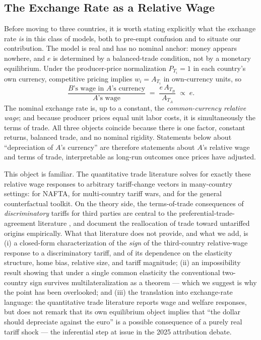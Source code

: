 \documentclass[11pt]{article}
\theoremstyle{plain}
\theoremstyle{remark}
\numberwithin{lemma}{section}
\numberwithin{proposition}{section}
\numberwithin{corollary}{section}
\newenvironment{revblock}{\par\begingroup\color{RevBlue}}{\endgroup\par}
\begin{document}
\begin{revblock}
\subsection{The Exchange Rate as a Relative Wage}
\label{sec:relwage}

Before moving to three countries, it is worth stating explicitly what the exchange rate \emph{is} in this class of models, both to pre-empt confusion and to situate our contribution. The model is real and has no nominal anchor: money appears nowhere, and $e$ is determined by a balanced-trade condition, not by a monetary equilibrium. Under the producer-price normalization $P_{T_i} = 1$ in each country's own currency, competitive pricing implies $w_i = A_{T_i}$ in own-currency units, so
\[
\frac{\text{$B$'s wage in $A$'s currency}}{\text{$A$'s wage}} \;=\; \frac{e\, A_{T_B}}{A_{T_A}} \;\propto\; e .
\]
The nominal exchange rate is, up to a constant, the \emph{common-currency relative wage}; and because producer prices equal unit labor costs, it is simultaneously the terms of trade. All three objects coincide because there is one factor, constant returns, balanced trade, and no nominal rigidity. Statements below about ``depreciation of $A$'s currency'' are therefore statements about $A$'s relative wage and terms of trade, interpretable as long-run outcomes once prices have adjusted.

This object is familiar. The quantitative trade literature solves for exactly these relative wage responses to arbitrary tariff-change vectors in many-country settings: \cite{caliendo2015} for NAFTA, \cite{ossa2014} for multi-country tariff wars, and \cite{costinot2014} for the general counterfactual toolkit. On the theory side, the terms-of-trade consequences of \emph{discriminatory} tariffs for third parties are central to the preferential-trade-agreement literature \citep{bagwell1999, bond1996, ornelas2005}, and \cite{fajgelbaum2024trade} document the reallocation of trade toward untariffed origins empirically. What that literature does not provide, and what we add, is (i) a closed-form characterization of the \emph{sign} of the third-country relative-wage response to a discriminatory tariff, and of its dependence on the elasticity structure, home bias, relative size, and tariff magnitude; (ii) an impossibility result showing that under a single common elasticity the conventional two-country sign survives multilateralization as a theorem --- which we suggest is why the point has been overlooked; and (iii) the translation into exchange-rate language: the quantitative trade literature reports wage and welfare responses, but does not remark that its own equilibrium object implies that ``the dollar should depreciate against the euro'' is a possible consequence of a purely real tariff shock --- the inferential step at issue in the 2025 attribution debate.
\end{revblock}
\end{document}
